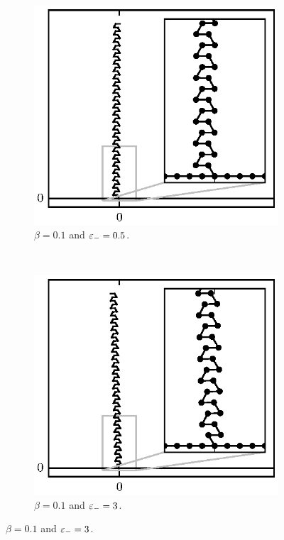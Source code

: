 	\begin{figure}[h!]
		\centering
		\begin{subfigure}{.5\textwidth}
			\centering
			\includegraphics{./fig/ch3/fs/b0.1_eb0.5.eps}
			\caption{$\beta=0.1$ and $\varepsilon_-=0.5$.\label{subfig:hex_chain}}
		\end{subfigure}%
		~
		\begin{subfigure}{.5\textwidth}
			\centering
			\includegraphics{./fig/ch3/fs/b0.1_eb3.eps}
			\caption{$\beta=0.1$ and $\varepsilon_-=3$.\label{subfig:leaning_hex_chain}}
		\end{subfigure}


\end{figure}
